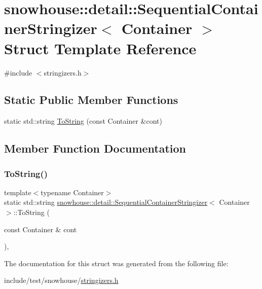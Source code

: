 \hypertarget{structsnowhouse_1_1detail_1_1SequentialContainerStringizer}{}\section{snowhouse\+::detail\+::Sequential\+Container\+Stringizer$<$ Container $>$ Struct Template Reference}
\label{structsnowhouse_1_1detail_1_1SequentialContainerStringizer}


{\ttfamily \#include $<$stringizers.\+h$>$}

\subsection*{Static Public Member Functions}
\begin{DoxyCompactItemize}
\item 
static std\+::string \mbox{\hyperlink{structsnowhouse_1_1detail_1_1SequentialContainerStringizer_af3ce6341cf8b240a02c04975fba93695}{To\+String}} (const Container \&cont)
\end{DoxyCompactItemize}


\subsection{Member Function Documentation}
\mbox{\label{structsnowhouse_1_1detail_1_1SequentialContainerStringizer_af3ce6341cf8b240a02c04975fba93695}} 
\subsubsection{\texorpdfstring{ToString()}{ToString()}}
{\footnotesize\ttfamily template$<$typename Container$>$ \\
static std\+::string \mbox{\hyperlink{structsnowhouse_1_1detail_1_1SequentialContainerStringizer}{snowhouse\+::detail\+::\+Sequential\+Container\+Stringizer}}$<$ Container $>$\+::To\+String (\begin{DoxyParamCaption}\item[{const Container \&}]{cont }\end{DoxyParamCaption})\hspace{0.3cm}{\ttfamily [inline]}, {\ttfamily [static]}}



The documentation for this struct was generated from the following file\+:\begin{DoxyCompactItemize}
\item 
include/test/snowhouse/\mbox{\hyperlink{stringizers_8h}{stringizers.\+h}}\end{DoxyCompactItemize}

